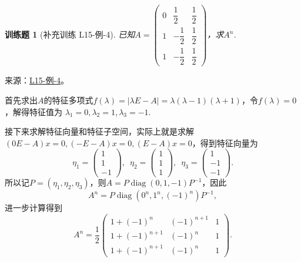 \documentclass[UTF8,12pt,a4paper,fontset=fandol]{ctexart}
\newtheorem{exercise}{训练题}[section]
\begin{document}
\begin{exercise}[补充训练 L15-例-4]\label{prob:L15-例-4}
已知$A=\begin{pmatrix}
            0 & \dfrac{1}{2}  & \dfrac{1}{2} \\[2ex]
            1 & -\dfrac{1}{2} & \dfrac{1}{2} \\[2ex]
            1 & -\dfrac{1}{2} & \dfrac{1}{2}
        \end{pmatrix}$，求$A^n$.
\end{exercise}
\noindent 来源：\href{https://github.com/yhwu-is/Linear-Algebra-Left-Undone/blob/new/%E8%AE%B2%E4%B9%89/%E4%B8%93%E9%A2%98/15%20%E7%9B%B8%E4%BC%BC%E6%A0%87%E5%87%86%E5%BD%A2%EF%BC%9A%E5%A4%8D%E6%95%B0%E5%9F%9F%E4%B8%8A%E7%9A%84%E5%B0%9D%E8%AF%95%E4%B8%8E%E7%90%86%E8%AE%BA.tex}{L15-例-4}。
\begin{solve}
首先求出$A$的特征多项式$f(\lambda)=|\lambda E-A|=\lambda(\lambda-1)(\lambda+1)$，令$f(\lambda)=0$，解得特征值为 $\lambda_1=0,\lambda_2=1,\lambda_3=-1$.

    接下来求解特征向量和特征子空间，实际上就是求解$(0E-A)x=0,(-E-A)x=0,(E-A)x=0$，得到特征向量为
    \[\eta_1=\begin{pmatrix}
            1 \\ 1 \\ -1
        \end{pmatrix},\enspace \eta_2=\begin{pmatrix}
            1 \\ 1 \\ 1
        \end{pmatrix},\enspace \eta_3=\begin{pmatrix}
            1 \\ -1 \\ -1
        \end{pmatrix}.\]
    所以记$P=(\eta_1,\eta_2,\eta_3)$，则$A=P\operatorname{diag}(0,1,-1)P^{-1}$，因此
    \[A^n=P\operatorname{diag}(0^n,1^n,(-1)^n)P^{-1},\]
    进一步计算得到
    \[A^n=\frac{1}{2}\begin{pmatrix}
            1+(-1)^n     & (-1)^{n+1} & 1 \\
            1+(-1)^{n+1} & (-1)^n     & 1 \\
            1+(-1)^{n+1} & (-1)^n     & 1
        \end{pmatrix}.\]
\end{solve}
\end{document}
